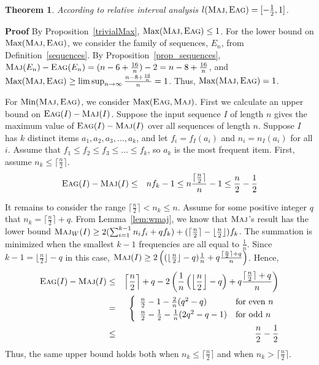 \documentclass[11pt]{article}
\newtheorem{xtheorem}{Theorem}
\newenvironment{theorem}{\begin{xtheorem}\rm}{\end{xtheorem}}
\newenvironment{proof}{\begin{trivlist}\item[]{\bf Proof }}{\hspace*{\fill}\raisebox{-1pt}{\boldmath$\Box$}\end{trivlist}}
\newcommand{\maj}{{\ensuremath{\textsc{Maj}}}\xspace}
\newcommand{\eag}{{\ensuremath{\textsc{Eag}}}\xspace}
\DeclareMathOperator{\Max}{\textrm{Max}}
\DeclareMathOperator{\Min}{\textrm{Min}}
\begin{document}
\begin{theorem}\label{thm:relint_maj_eag}
 According to relative interval analysis $l(\maj, \eag) = [-\frac{1}{2}, 1]$.
\end{theorem}
\begin{proof}
By Proposition~\ref{trivialMax}, $\Max(\maj,\eag)\leq 1$.
For the lower bound on $\Max(\maj,\eag)$, we consider the family of
sequences, $E_n$, from Definition~\ref{sequences}.
By Proposition~\ref{prop_sequences},
$\maj(E_n) - \eag(E_n) = (n-6+\frac{16}{n}) -2
= n - 8 + \frac{16}{n}$, and
$\Max(\maj,\eag)\geq \limsup_{n\to \infty} \frac{n-8+\frac{16}{n}}{n} = 1$.
Thus,
$\Max(\maj, \eag) = 1$.

For $\Min(\maj, \eag)$, we consider $\Max(\eag, \maj)$.
First we calculate an upper bound on $\eag(I) - \maj(I)$.
Suppose the input sequence $I$ of length $n$ gives the maximum value of $\eag(I) - \maj(I)$ over all sequences of length $n$.
Suppose $I$ has $k$ distinct items $a_1, a_2, a_3, \ldots , a_k$, and let $f_i=f_I(a_i)$ and $n_i = n_I(a_i)$ for all $i$. Assume that $f_1 \leq f_2 \leq f_3 \leq \ldots \leq f_k$, so $a_k$ is the most frequent item.
First, assume $n_k \leq \lceil \frac{n}{2} \rceil$.
\begin{eqnarray}
\eag(I) - \maj(I) &\leq& nf_k -  1 
\leq  n\frac{\lceil \frac{n}{2} \rceil}{n} - 1
\leq \frac{n}{2} - \frac{1}{2}
\label{eq:majcond}
\end{eqnarray}


It remains to consider the range $\lceil \frac{n}{2} \rceil < n_k \leq n$.
Assume for some positive integer $q$ that  $n_k = \lceil \frac{n}{2} \rceil + q$.
From Lemma~\ref{lem:wmaj}, we know that \maj's result has the lower bound $\maj_W(I) \geq 2(\sum_{i=1}^{k-1} n_i f_i + qf_k) + (\lceil \frac{n}{2} \rceil - \lfloor
\frac{n}{2} \rfloor)f_k$. The summation is minimized when the smallest $k-1$
frequencies are all equal to $\frac{1}{n}$. Since $k-1= \lfloor\frac{n}{2}
\rfloor-q$ in this case,
$\maj(I)\geq 2\left((\lfloor\frac{n}{2}\rfloor -q)\frac{1}{n} + q\frac{\lceil \frac{n}{2}\rceil+q}{n}\right)$. Hence,
\begin{eqnarray}
\eag(I) - \maj(I) &\leq& \left\lceil \frac{n}{2} \right\rceil + q -  2\left( \frac{1}{n}\left(\left\lfloor \frac{n}{2} \right\rfloor -q \right) + q \frac{\lceil \frac{n}{2} \rceil + q}{n}  \right)  \nonumber
\\
&=& \left\{ \begin{array}{ll}
\frac{n}{2} - 1 - \frac{2}{n}(q^2 - q) & \mbox{for even $n$}\vspace{1 mm} \\
\frac{n}{2} - \frac{1}{2} - \frac{1}{n}(2q^2 - q-1) & \mbox{for odd $n$}
\end{array} \right. \nonumber
\\
&\leq&
\frac{n}{2} - \frac{1}{2}
\label{eq:majcond2}
\end{eqnarray}
Thus, the same upper bound holds both when $n_k\leq \lceil\frac{n}{2}\rceil$ and
when $n_k > \lceil\frac{n}{2}\rceil$.


\end{proof}
\end{document}
